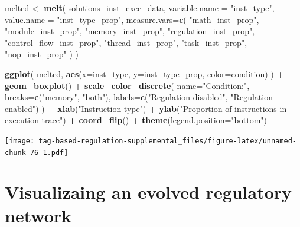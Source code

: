 \documentclass[
]{book}
\newenvironment{Shaded}{\begin{snugshade}}{\end{snugshade}}
\newcommand{\DataTypeTok}[1]{\textcolor[rgb]{0.13,0.29,0.53}{#1}}
\newcommand{\KeywordTok}[1]{\textcolor[rgb]{0.13,0.29,0.53}{\textbf{#1}}}
\newcommand{\NormalTok}[1]{#1}
\newcommand{\OperatorTok}[1]{\textcolor[rgb]{0.81,0.36,0.00}{\textbf{#1}}}
\newcommand{\StringTok}[1]{\textcolor[rgb]{0.31,0.60,0.02}{#1}}
\begin{document}
\begin{Shaded}
\begin{Highlighting}[]
\NormalTok{melted \textless{}{-}}\StringTok{ }\KeywordTok{melt}\NormalTok{(}
\NormalTok{  solutions\_inst\_exec\_data,}
  \DataTypeTok{variable.name =} \StringTok{"inst\_type"}\NormalTok{,}
  \DataTypeTok{value.name =} \StringTok{"inst\_type\_prop"}\NormalTok{,}
  \DataTypeTok{measure.vars=}\KeywordTok{c}\NormalTok{(}
    \StringTok{"math\_inst\_prop"}\NormalTok{,}
    \StringTok{"module\_inst\_prop"}\NormalTok{,}
    \StringTok{"memory\_inst\_prop"}\NormalTok{,}
    \StringTok{"regulation\_inst\_prop"}\NormalTok{,}
    \StringTok{"control\_flow\_inst\_prop"}\NormalTok{,}
    \StringTok{"thread\_inst\_prop"}\NormalTok{,}
    \StringTok{"task\_inst\_prop"}\NormalTok{,}
    \StringTok{"nop\_inst\_prop"}
\NormalTok{  )}
\NormalTok{)}

\KeywordTok{ggplot}\NormalTok{( melted, }\KeywordTok{aes}\NormalTok{(}\DataTypeTok{x=}\NormalTok{inst\_type, }\DataTypeTok{y=}\NormalTok{inst\_type\_prop, }\DataTypeTok{color=}\NormalTok{condition) ) }\OperatorTok{+}
\StringTok{  }\KeywordTok{geom\_boxplot}\NormalTok{() }\OperatorTok{+}
\StringTok{  }\KeywordTok{scale\_color\_discrete}\NormalTok{(}
    \DataTypeTok{name=}\StringTok{"Condition:"}\NormalTok{,}
    \DataTypeTok{breaks=}\KeywordTok{c}\NormalTok{(}\StringTok{"memory"}\NormalTok{, }\StringTok{"both"}\NormalTok{),}
    \DataTypeTok{labels=}\KeywordTok{c}\NormalTok{(}\StringTok{"Regulation{-}disabled"}\NormalTok{, }\StringTok{"Regulation{-}enabled"}\NormalTok{)}
\NormalTok{  ) }\OperatorTok{+}
\StringTok{  }\KeywordTok{xlab}\NormalTok{(}\StringTok{"Instruction type"}\NormalTok{) }\OperatorTok{+}
\StringTok{  }\KeywordTok{ylab}\NormalTok{(}\StringTok{"Proportion of instructions in execution trace"}\NormalTok{) }\OperatorTok{+}
\StringTok{  }\KeywordTok{coord\_flip}\NormalTok{() }\OperatorTok{+}
\StringTok{  }\KeywordTok{theme}\NormalTok{(}\DataTypeTok{legend.position=}\StringTok{"bottom"}\NormalTok{)}
\end{Highlighting}
\end{Shaded}

\texttt{[image: tag-based-regulation-supplemental\_files/figure-latex/unnamed-chunk-76-1.pdf]}

\hypertarget{visualizaing-an-evolved-regulatory-network}{%
\section{Visualizaing an evolved regulatory network}\label{visualizaing-an-evolved-regulatory-network}}
\end{document}

